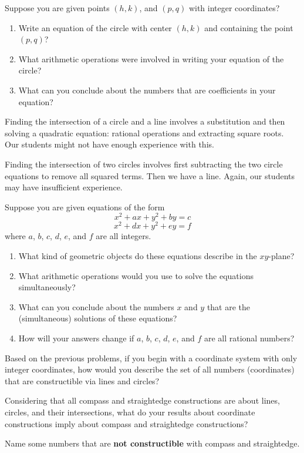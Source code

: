 \begin{prob}
Suppose you are given points $(h, k)$, and $(p, q)$ with integer coordinates?  
\begin{enumerate}
\item Write an equation of the circle with center $(h, k)$ and containing the point $(p, q)$?  
\item What arithmetic operations were involved in writing your equation of the circle?  
\item What can you conclude about the numbers that are coefficients in your equation?   
\end{enumerate}
\end{prob}

\begin{teachingnote}
Finding the intersection of a circle and a line involves a substitution and then solving a quadratic equation:  rational operations and extracting square roots.  Our students might not have enough experience with this.  

Finding the intersection of two circles involves first subtracting the two circle equations to remove all squared terms.  Then we have a  line.  Again, our students may have insufficient experience.  
\end{teachingnote}

\begin{prob}
Suppose you are given equations of the form 
$$x^2 + ax +y^2+by = c$$
$$x^2 + dx +y^2+ey = f$$
where $a$, $b$, $c$, $d$, $e$, and $f$ are all integers.  
\begin{enumerate}
\item What kind of geometric objects do these equations describe in the $xy$-plane?  
\item What arithmetic operations would you use to solve the equations simultaneously? 
\item What can you conclude about the numbers $x$ and $y$ that are the (simultaneous) solutions of these equations?  
\item How will your answers change if $a$, $b$, $c$, $d$, $e$, and $f$  are all rational numbers?  
\end{enumerate}
\end{prob}

\begin{prob}
Based on the previous problems, if you begin with a coordinate system with only integer coordinates, how would you describe the set of all numbers (coordinates) that are constructible via lines and circles?  
\end{prob}

\begin{prob}
Considering that all compass and straightedge constructions are about lines, circles, and their intersections, what do your results about coordinate constructions imply about compass and straightedge constructions?  
\end{prob}

\begin{prob}
Name some numbers that are \textbf{not constructible} with compass and straightedge.  
\end{prob}
